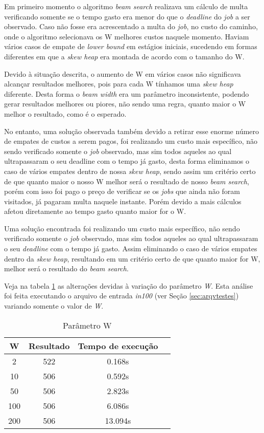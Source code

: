 \documentclass[
	11pt,				%
	oneside,			%
	a4paper,			%
	english,			%
	brazil,				%
	]{article}
\begin{document}
Em primeiro momento o algoritmo \textit{beam search} realizava um cálculo de multa verificando somente se o tempo gasto era menor do que o \textit{deadline} do \textit{job} a ser observado. Caso não fosse era acrescentado a multa do \textit{job}, no custo do caminho, onde o algoritmo selecionava os W melhores custos naquele momento. Haviam vários casos de empate de \textit{lower bound} em estágios iniciais, sucedendo em formas diferentes em que a \textit{skew heap} era montada de acordo com o tamanho do W.

Devido à situação descrita, o aumento de W em vários casos não significava alcançar resultados melhores, pois para cada W tínhamos uma \textit{skew heap} diferente. Desta forma o \textit{beam width} era um parâmetro inconsistente, podendo gerar resultados melhores ou piores, não sendo uma regra, quanto maior o W melhor o resultado, como é o esperado.

No entanto, uma solução observada também devido a retirar esse enorme número de empates de custos a serem pagos, foi realizando um custo mais específico, não sendo verificado somente o \textit{job} observado, mas sim todos aqueles ao qual ultrapassaram o seu deadline com o tempo já gasto, desta forma eliminamos o caso de vários empates dentro de nossa \textit{skew heap}, sendo assim um critério certo de que quanto maior o nosso W melhor será o resultado de nosso \textit{beam search}, porém com isso foi pago o preço de verificar se os \textit{jobs} que ainda não foram visitados, já pagaram multa naquele instante. Porém devido a mais cálculos afetou diretamente ao tempo gasto quanto maior for o W.

Uma solução encontrada foi realizando um custo mais específico, não sendo verificado somente o \textit{job} observado, mas sim todos aqueles ao qual ultrapassaram o seu \textit{deadline} com o tempo já gasto. Assim eliminando o caso de vários empates dentro da \textit{skew heap}, resultando em um critério certo de que quanto maior for W, melhor será o resultado do \textit{beam search}.

Veja na tabela \ref{tab:w} as alterações devidas à variação do parâmetro \textit{W}. Esta análise foi feita executando o arquivo de entrada \textit{in100} (ver Seção \ref{sec:arqvtestes}) variando somente o valor de \textit{W}.

\begin{table}[ht]
\centering
\begin{tabular}{cccc}
\hline 
\textbf{W} & \textbf{Resultado} & \textbf{Tempo de execução} \\
\hline
2   & 522 & 0.168s  \\ 
10  & 506 & 0.592s  \\ 
50  & 506 & 2.823s  \\
100 & 506 & 6.086s  \\
200 & 506 & 13.094s \\
\hline
\end{tabular}
\caption{Parâmetro W}
\label{tab:w}
\end{table}
\end{document}
